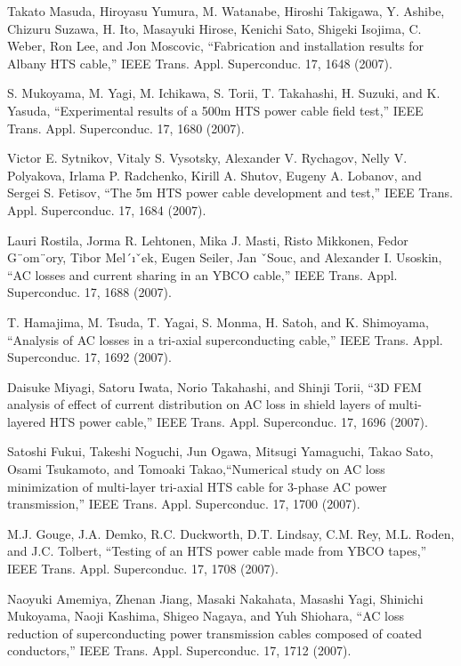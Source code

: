 \noindent [9.188] Takato Masuda, Hiroyasu Yumura, M. Watanabe, Hiroshi Takigawa, Y. Ashibe,
Chizuru Suzawa, H. Ito, Masayuki Hirose, Kenichi Sato, Shigeki Isojima, C. Weber,
Ron Lee, and Jon Moscovic, ``Fabrication and installation results for Albany
HTS cable,” IEEE Trans. Appl. Superconduc. 17, 1648 (2007).

\noindent [9.189] S. Mukoyama, M. Yagi, M. Ichikawa, S. Torii, T. Takahashi, H. Suzuki, and
K. Yasuda, ``Experimental results of a 500m HTS power cable field test,” IEEE
Trans. Appl. Superconduc. 17, 1680 (2007).

\noindent [9.190] Victor E. Sytnikov, Vitaly S. Vysotsky, Alexander V. Rychagov, Nelly V. Polyakova,
Irlama P. Radchenko, Kirill A. Shutov, Eugeny A. Lobanov, and Sergei
S. Fetisov, ``The 5m HTS power cable development and test,” IEEE Trans. Appl.
Superconduc. 17, 1684 (2007).

\noindent [9.191] Lauri Rostila, Jorma R. Lehtonen, Mika J. Masti, Risto Mikkonen, Fedor G¨om¨ory,
Tibor Mel´ıˇek, Eugen Seiler, Jan ˇSouc, and Alexander I. Usoskin, ``AC losses and
current sharing in an YBCO cable,” IEEE Trans. Appl. Superconduc. 17, 1688
(2007).

\noindent [9.192] T. Hamajima, M. Tsuda, T. Yagai, S. Monma, H. Satoh, and K. Shimoyama,
``Analysis of AC losses in a tri-axial superconducting cable,” IEEE Trans. Appl.
Superconduc. 17, 1692 (2007).

\noindent [9.193] Daisuke Miyagi, Satoru Iwata, Norio Takahashi, and Shinji Torii, ``3D FEM analysis
of effect of current distribution on AC loss in shield layers of multi-layered
HTS power cable,” IEEE Trans. Appl. Superconduc. 17, 1696 (2007).

\noindent [9.194] Satoshi Fukui, Takeshi Noguchi, Jun Ogawa, Mitsugi Yamaguchi, Takao Sato,
Osami Tsukamoto, and Tomoaki Takao,``Numerical study on AC loss minimization
of multi-layer tri-axial HTS cable for 3-phase AC power transmission,” IEEE
Trans. Appl. Superconduc. 17, 1700 (2007).

\noindent [9.195] M.J. Gouge, J.A. Demko, R.C. Duckworth, D.T. Lindsay, C.M. Rey, M.L. Roden,
and J.C. Tolbert, ``Testing of an HTS power cable made from YBCO tapes,” IEEE
Trans. Appl. Superconduc. 17, 1708 (2007).

\noindent [9.196] Naoyuki Amemiya, Zhenan Jiang, Masaki Nakahata, Masashi Yagi, Shinichi
Mukoyama, Naoji Kashima, Shigeo Nagaya, and Yuh Shiohara, ``AC loss reduction
of superconducting power transmission cables composed of coated conductors,”
IEEE Trans. Appl. Superconduc. 17, 1712 (2007).

